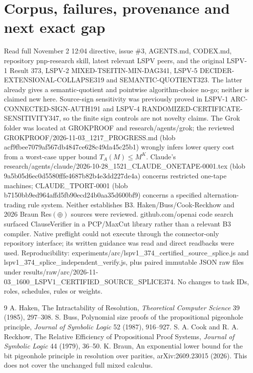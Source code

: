 \documentclass[11pt]{article}
\begin{document}
\section*{Corpus, failures, provenance and next exact gap}
Read full November 2 12:04 directive, issue \#3, AGENTS.md, CODEX.md, repository pnp-research skill, latest relevant LSPV peers, and the original LSPV-1 Result 373, LSPV-2 MIXED-TSEITIN-MIN-DAG341, LSPV-5 DECIDER-EXTENSIONAL-COLLAPSE319 and SEMANTIC-QUOTIENT323. The latter already gives a semantic-quotient and pointwise algorithm-choice no-go; neither is claimed new here. Source-sign sensitivity was previously proved in LSPV-1 ARC-CONNECTED-SIGN-AUTH191 and LSPV-4 RANDOMIZED-CERTIFICATE-SENSITIVITY347, so the finite sign controls are not novelty claims. The Grok folder was located at GROKPROOF and research/agents/grok; the reviewed GROKPROOF/2026-11-03\_1217\_PROGRESS.md (blob acf9fbee7079af567db4847ce628c49da45c25b1) wrongly infers lower query cost from a worst-case upper bound $T_A(M)\le M^K$. Claude's research/agents/claude/2026-10-28\_1521\_CLAUDE\_ONETAPE-0001.tex (blob 9a5b05d6ec0d5580fffe4687b82b4e3dd227de4a) concerns restricted one-tape machines; CLAUDE\_TPORT-0001 (blob b7150bb9ed964affd5fb90ecd24b0aa35d600bf9) concerns a specified alternation-trading rule system. Neither establishes B3. Haken/Buss/Cook-Reckhow and 2026 Braun Res$(\oplus)$ sources were reviewed. github.com/openai code search surfaced ClauseVerifier in a PCP/MaxCut library rather than a relevant B3 compiler. Native preflight could not execute through the connector-only repository interface; its written guidance was read and direct readbacks were used. Reproducibility: experiments/arc/lspv1\_374\_certified\_source\_splice.js and lspv1\_374\_splice\_independent\_verify.js, plus paired immutable JSON raw files under results/raw/arc/2026-11-03\_1600\_LSPV1\_CERTIFIED\_SOURCE\_SPLICE374. No changes to task IDs, roles, schedules, rules or weights.

\begin{thebibliography}{9}
 A. Haken, The Intractability of Resolution, \emph{Theoretical Computer Science} 39 (1985), 297--308.
 S. Buss, Polynomial size proofs of the propositional pigeonhole principle, \emph{Journal of Symbolic Logic} 52 (1987), 916--927.
 S. A. Cook and R. A. Reckhow, The Relative Efficiency of Propositional Proof Systems, \emph{Journal of Symbolic Logic} 44 (1979), 36--50.
 K. Braun, An exponential lower bound for the bit pigeonhole principle in resolution over parities, arXiv:2609.23015 (2026). This does not cover the unchanged full mixed calculus.
\end{thebibliography}
\end{document}
